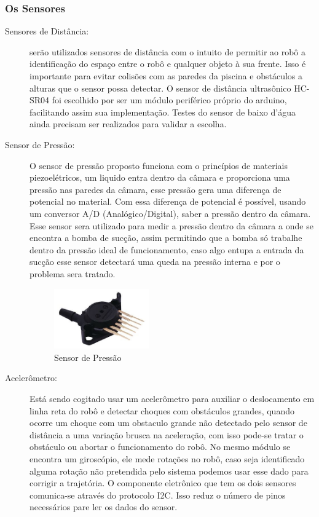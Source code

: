 \subsubsection{Os Sensores}
\begin{description}
\item[Sensores de Distância:] serão utilizados sensores de distância com o intuito de permitir ao robô a identificação do espaço entre o robô e qualquer objeto à sua frente. Isso é importante para evitar colisões com as paredes da piscina e obstáculos a alturas que o sensor possa detectar. O sensor de distância ultrasônico \textsf{HC-SR04} foi escolhido  por ser um módulo periférico próprio do arduino, facilitando assim sua implementação. Testes do sensor de baixo d'água ainda precisam ser realizados para validar a escolha.
\item[Sensor de Pressão:] O sensor de pressão proposto funciona com o princípios de materiais piezoelétricos, um liquido entra dentro da câmara e proporciona uma pressão nas paredes da câmara, esse pressão gera uma diferença de potencial no material. Com essa diferença de potencial é possível, usando um conversor A/D (Analógico/Digital), saber a pressão dentro da câmara. Esse sensor sera utilizado para medir a pressão dentro da câmara a onde se encontra a bomba de sucção, assim permitindo que a bomba só trabalhe dentro da pressão ideal de funcionamento, caso algo entupa a entrada da sucção esse sensor detectará  uma queda na pressão interna e por \software o problema sera tratado.
\par
\begin{figure}[h]
  \centering
  \includegraphics[width=0.4\textwidth]{figures/pressure-sensor.png}
  \caption{Sensor de Pressão \cite{octopart2016}}
  \label{fig:a}
\end{figure}
\FloatBarrier
\par
\item[Acelerômetro:] Está sendo cogitado usar um acelerômetro para auxiliar o deslocamento em linha reta do robô e detectar choques com obstáculos grandes, quando ocorre um choque com um obstaculo grande não detectado pelo sensor de distância a uma variação brusca na aceleração, com isso pode-se tratar o obstáculo ou abortar o funcionamento do robô. No mesmo módulo se encontra um giroscópio, ele mede rotações no robô, caso seja identificado alguma rotação não pretendida pelo sistema podemos usar esse dado para corrigir a trajetória. O componente eletrônico que tem os dois sensores comunica-se através do protocolo I2C. Isso reduz o número de pinos necessários pare ler os dados do sensor.

\end{description}

